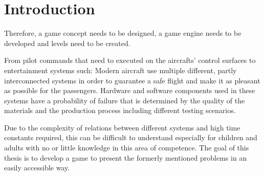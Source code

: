 \chapter{Introduction}\label{ch:introduction}


Therefore, a game concept needs to be designed, a game engine needs to be developed and levels need to be created.

From pilot commands that need to executed on the aircrafts' control surfaces to entertainment systems such:
Modern aircraft use multiple different, partly interconnected systems in order to guarantee a safe flight and make it
as pleasant as possible for the passengers.
Hardware and software components used in these systems have a probability of failure that is determined by the quality of the materials
and the production process including different testing scenarios. 

Due to the complexity of relations between different systems and high time constants required, this can be difficult
to understand especially for children and adults with no or little knowledge in this area of competence.
The goal of this thesis is to develop a game to present the formerly mentioned problems in an easily
accessible way.
